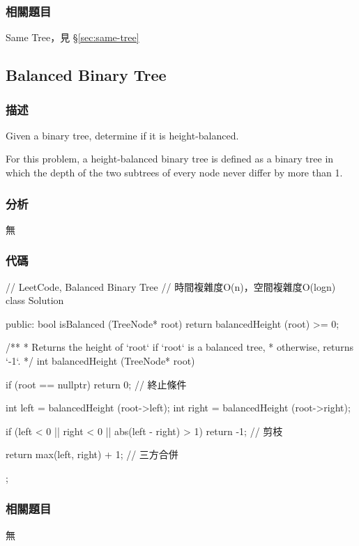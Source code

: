\subsubsection{相關題目}
\begindot
\item Same Tree，見 \S \ref{sec:same-tree}
\myenddot


\subsection{Balanced Binary Tree}
\label{sec:balanced-binary-tree}


\subsubsection{描述}
Given a binary tree, determine if it is height-balanced.

For this problem, a height-balanced binary tree is defined as a binary tree in which the depth of the two subtrees of every node never differ by more than 1.


\subsubsection{分析}
無


\subsubsection{代碼}
\begin{Code}
// LeetCode, Balanced Binary Tree
// 時間複雜度O(n)，空間複雜度O(logn)
class Solution {
public:
    bool isBalanced (TreeNode* root) {
        return balancedHeight (root) >= 0;
    }

    /**
     * Returns the height of `root` if `root` is a balanced tree,
     * otherwise, returns `-1`.
     */
    int balancedHeight (TreeNode* root) {
        if (root == nullptr) return 0;  // 終止條件

        int left = balancedHeight (root->left);
        int right = balancedHeight (root->right);

        if (left < 0 || right < 0 || abs(left - right) > 1) return -1;  // 剪枝

        return max(left, right) + 1; // 三方合併
    }
};
\end{Code}


\subsubsection{相關題目}
\begindot
\item 無
\myenddot


